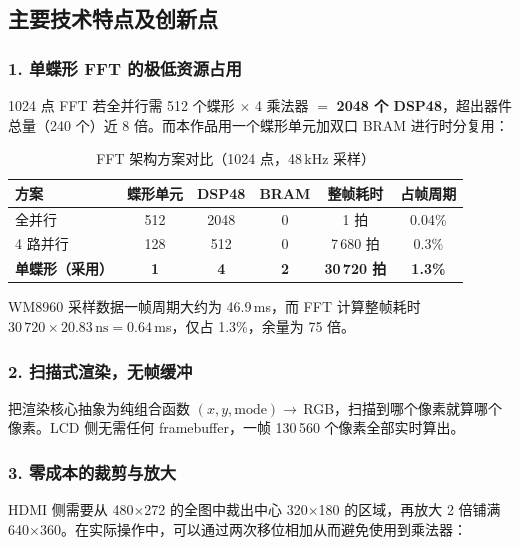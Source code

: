 \documentclass[withoutpreface,bwprint]{cumcmthesis}
\begin{document}
\subsection{主要技术特点及创新点}

\subsubsection*{1. 单蝶形 FFT 的极低资源占用}

1024 点 FFT 若全并行需 512 个蝶形 $\times$ 4 乘法器 $=$ \textbf{2048 个 DSP48}，超出器件总量（240 个）近 8 倍。而本作品用一个蝶形单元加双口 BRAM 进行时分复用：

\begin{table}[H]
\centering
\caption{FFT 架构方案对比（1024 点，48\,kHz 采样）}
\label{tab:fft}
\begin{tabular}{lccccc}
\toprule[1.5pt]
\rowcolor{gray!25} 方案 & 蝶形单元 & DSP48 & BRAM & 整帧耗时 & 占帧周期 \\
\midrule[1pt]
全并行 & 512 & 2048 & 0 & 1 拍 & 0.04\% \\
4 路并行 & 128 & 512 & 0 & 7\,680 拍 & 0.3\% \\
\textbf{单蝶形（采用）} & \textbf{1} & \textbf{4} & \textbf{2} & \textbf{30\,720 拍} & \textbf{1.3\%} \\
\bottomrule[1.5pt]
\end{tabular}
\end{table}

WM8960 采样数据一帧周期大约为 46.9\,ms，而 FFT 计算整帧耗时 $30\,720 \times 20.83\,\text{ns} = 0.64$\,ms，仅占 1.3\%，余量为 75 倍。

\subsubsection*{2. 扫描式渲染，无帧缓冲}

把渲染核心抽象为纯组合函数 $(x,y,\text{mode}) \rightarrow$\,RGB，扫描到哪个像素就算哪个像素。LCD 侧无需任何 framebuffer，一帧 130\,560 个像素全部实时算出。

\subsubsection*{3. 零成本的裁剪与放大}

HDMI 侧需要从 480$\times$272 的全图中裁出中心 320$\times$180 的区域，再放大 2 倍铺满 640$\times$360。在实际操作中，可以通过两次移位相加从而避免使用到乘法器：
\end{document}
